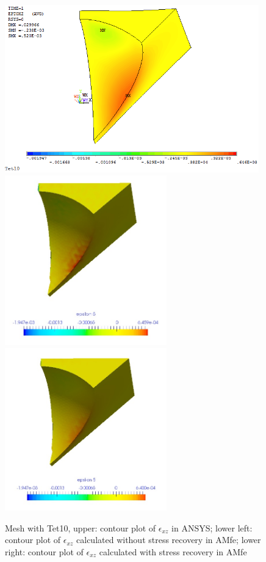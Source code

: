 \begin{figure}[htbp]
	\begin{center}
		\includegraphics[width=11cm,clip]{Tet10_Exz.png} 
		\includegraphics[width=7cm,clip]{Tet10_Exz_PD.png} 			
		\includegraphics[width=7cm,clip]{Tet10_Exz_P.png} 		
		\caption{Mesh with Tet10, upper: contour plot of $\epsilon_{xz}$ in ANSYS; lower left: contour plot of $\epsilon_{xz}$ calculated without stress recovery in AMfe; lower right: contour plot of $\epsilon_{xz}$ calculated with stress recovery in AMfe} \label{fig: Tet10_Exz}
	\end{center}
\end{figure}
\clearpage 

